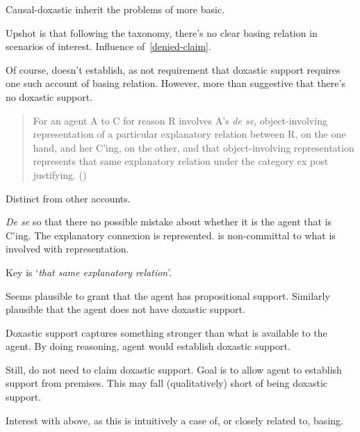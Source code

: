 \begin{note}[Doxastic]
  Causal-doxastic inherit the problems of more basic.

  Upshot is that following the taxonomy, there's no clear basing relation in scenarios of interest.
  Influence of~\ref{denied-claim}.

  Of course, doesn't establish, as not requirement that doxastic support requires one such account of basing relation.
  However, more than suggestive that there's no doxastic support.

  
\end{note}

\begin{note}
    \begin{quote}
    For an agent A to C for reason R involves A’s \emph{de se}, object-involving representation of a particular explanatory relation between R, on the one hand, and her C’ing, on the other, and that object-involving representation represents that same explanatory relation under the category ex post justifying.\nolinebreak
    \mbox{}\hfill\mbox{(\citeyear[204]{Neta:2019aa})}
  \end{quote}
  Distinct from other accounts.

  \emph{De se} so that there no possible mistake about whether it is the agent that is C'ing.
  The explanatory connexion is represented.
  \citeauthor{Neta:2019aa} is non-committal to what is involved with representation.

  Key is `\emph{that same explanatory relation}'.
\end{note}

\begin{note}[Summarising]
  Seems plausible to grant that the agent has propositional support.
  Similarly plausible that the agent does not have doxastic support.

  Doxastic support captures something stronger than what is available to the agent.
  By doing reasoning, agent would establish doxastic support.

  Still, do not need to claim doxastic support.
  Goal is to allow agent to establish support from premises.
  This may fall (qualitatively) short of being doxastic support.

  Interest with above, as this is intuitively a case of, or closely related to, basing.
\end{note}

